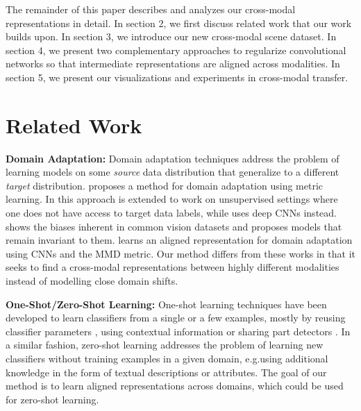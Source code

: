 \documentclass[10pt,journal,compsoc]{IEEEtran}
\begin{document}
    The remainder of this paper describes and analyzes our cross-modal representations in detail. In section 2, we first discuss related work that our work builds upon. In section 3, we introduce our new cross-modal scene dataset. In section 4, we present two complementary approaches to regularize convolutional networks so that intermediate representations are aligned across modalities. In section 5, we present our visualizations and experiments in cross-modal transfer. 

\section{Related Work}
	\textbf{Domain Adaptation:}
		Domain adaptation techniques address the problem of learning models on some \textit{source} data distribution that generalize to a different \textit{target} distribution. \cite{saenko2010adapting} proposes a method for domain adaptation using metric learning. In \cite{gopalan2011domain} this approach is extended to work on unsupervised settings where one does not have access to target data labels, while \cite{tzeng2015simultaneous} uses deep CNNs instead. \cite{torralba2011unbiased} shows the biases inherent in common vision datasets and \cite{khosla2012undoing} proposes models that remain invariant to them. \cite{long2015learning} learns an aligned representation for domain adaptation using CNNs and the MMD metric. Our method differs from these works in that it seeks to find a cross-modal representations between highly different modalities instead of modelling close domain shifts.
	
	\textbf{One-Shot/Zero-Shot Learning:}
		One-shot learning techniques \cite{fei2006one} have been developed to learn classifiers from a single or a few examples, mostly by reusing classifier parameters \cite{fink2005object}, using contextual information \cite{murphy2004contextual,hoiem2005geometric} or sharing part detectors \cite{bart2005cross}. In a similar fashion, zero-shot learning \cite{lampert2009learning, palatucci2009zero, elhoseiny2013write, ba2015predicting,vondrick2015learning} addresses the problem of learning new classifiers without training examples in a given domain, e.g.\by using additional knowledge in the form of textual descriptions or attributes. The goal of our method is to learn aligned representations across domains, which could be used for zero-shot learning.
	
\end{document}

